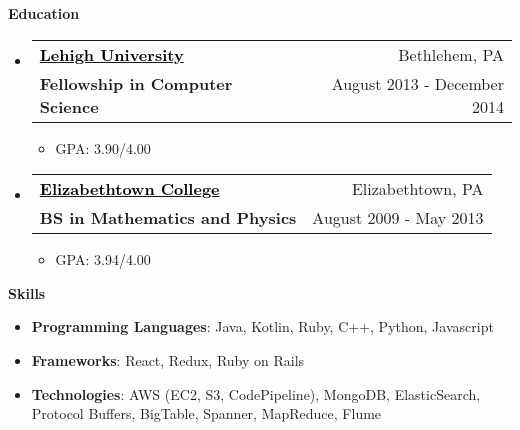 \documentclass[letterpaper,12pt]{article}
\makeatletter
\newcommand{\link}[2]{\href{#1}{\textcolor{black}{#2}}}
\newcommand{\resitem}[1]{\item #1 \vspace{-2pt}}
\newcommand{\resheading}[1]{{\large \colorbox{mygrey}{\begin{minipage}{\textwidth}{\textbf{\sc #1 \vphantom{p\^{E}}}}\end{minipage}}}}
\newcommand{\ressubheading}[4]{
	\begin{tabular*}{6.5in}{l@{\extracolsep{\fill}}r}
			\textbf{#1} & #2 \\
			\textbf{#3} & #4 \\
	\end{tabular*}\vspace{-6pt}
}
\makeatother
\begin{document}
\resheading{Education}
	\begin{itemize}
        \item \ressubheading
            {\link{http://www.cse.lehigh.edu/}{Lehigh University}}
            {Bethlehem, PA}
            {Fellowship in Computer Science}
            {August 2013 - December 2014}
                \begin{itemize}
                    \resitem{GPA: 3.90/4.00}
                \end{itemize}
        \item \ressubheading
            {\link{http://www.etown.edu}{Elizabethtown College}}
            {Elizabethtown, PA}
            {BS in Mathematics and Physics}
            {August 2009 - May 2013}
                \begin{itemize}
                    \resitem{GPA: 3.94/4.00}
                \end{itemize}	
	\end{itemize} %

\resheading{Skills}
	\begin{itemize}
		\resitem{\textbf{Programming Languages}: Java, Kotlin, Ruby, C++, Python, Javascript}
		\resitem{\textbf{Frameworks}: React, Redux, Ruby on Rails}
        \resitem{\textbf{Technologies}: AWS (EC2, S3, CodePipeline), MongoDB, ElasticSearch, Protocol Buffers, BigTable, Spanner, MapReduce, Flume}
	\end{itemize} %
    
\end{document}
